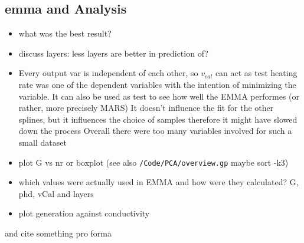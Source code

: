\subsection{emma and Analysis}
\begin{itemize}
    \item what was the best result? 
    \item discuss layers: less layers are better in prediction of? 
    \item Every output var is independent of each other, so $v_{cal}$ can act as test 
heating rate was one of the dependent variables with the intention of minimizing the variable. 
It can also be used as test to see how well the EMMA performes (or rather, more precisely MARS)
It doesn't influence the fit for the other splines, but it influences the choice of samples therefore it might have slowed down the process
Overall there were too many variables involved for such a small dataset
    \item plot G vs nr or boxplot (see also \texttt{/Code/PCA/overview.gp} maybe sort -k3) 
    \item which values were actually used in EMMA and how were they calculated?
        G, phd, vCal and layers
    \item plot generation against conductivity
\end{itemize}

and cite something pro forma \cite{ncbi1butanol}
